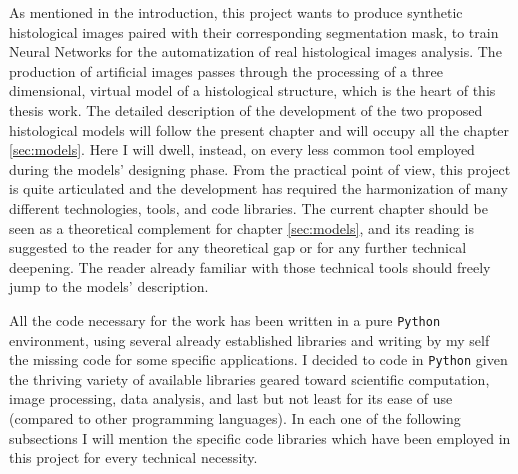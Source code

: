 As mentioned in the introduction, this project wants to produce synthetic histological images paired with their corresponding segmentation mask, to train Neural Networks for the automatization of real histological images analysis. The production of artificial images passes through the processing of a three dimensional, virtual model of a histological structure, which is the heart of this thesis work. The detailed description of the development of the two proposed histological models will follow the present chapter and will occupy all the chapter \ref{sec:models}. Here I will dwell, instead, on every less common tool employed during the models' designing phase. From the practical point of view, this project is quite articulated and the development has required the harmonization of many different technologies, tools, and code libraries. The current chapter should be seen as a theoretical complement for chapter \ref{sec:models}, and its reading is suggested to the reader for any theoretical gap or for any further technical deepening. The reader already familiar with those technical tools should freely jump to the models' description.

All the code necessary for the work has been written in a pure \texttt{Python} environment, using several already established libraries and writing by my self the missing code for some specific applications. I decided to code in \texttt{Python} given the thriving variety of available libraries geared toward scientific computation, image processing, data analysis, and last but not least for its ease of use (compared to other programming languages). In each one of the following subsections I will mention the specific code libraries which have been employed in this project for every technical necessity.
